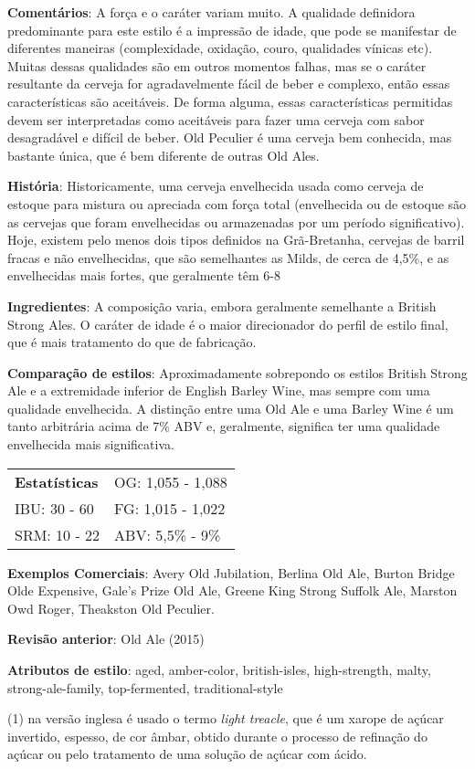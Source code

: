\textbf{Comentários}: A força e o caráter variam muito. A qualidade definidora predominante para este estilo é a impressão de idade, que pode se manifestar de diferentes maneiras (complexidade, oxidação, couro, qualidades vínicas etc). Muitas dessas qualidades são em outros momentos falhas, mas se o caráter resultante da cerveja for agradavelmente fácil de beber e complexo, então essas características são aceitáveis. De forma alguma, essas características permitidas devem ser interpretadas como aceitáveis para fazer uma cerveja com sabor desagradável e difícil de beber. Old Peculier é uma cerveja bem conhecida, mas bastante única, que é bem diferente de outras Old Ales.

\textbf{História}: Historicamente, uma cerveja envelhecida usada como cerveja de estoque para mistura ou apreciada com força total (envelhecida ou de estoque são as cervejas que foram envelhecidas ou armazenadas por um período significativo). Hoje, existem pelo menos dois tipos definidos na Grã-Bretanha, cervejas de barril fracas e não envelhecidas, que são semelhantes as Milds, de cerca de 4,5\%, e as envelhecidas mais fortes, que geralmente têm 6-8%

\textbf{Ingredientes}: A composição varia, embora geralmente semelhante a British Strong Ales. O caráter de idade é o maior direcionador do perfil de estilo final, que é mais tratamento do que de fabricação.

\textbf{Comparação de estilos}: Aproximadamente sobrepondo os estilos British Strong Ale e a extremidade inferior de English Barley Wine, mas sempre com uma qualidade envelhecida. A distinção entre uma Old Ale e uma Barley Wine é um tanto arbitrária acima de 7\% ABV e, geralmente, significa ter uma qualidade envelhecida mais significativa.

\begin{tabular}{@{}p{35mm}p{35mm}@{}}
  \textbf{Estatísticas} & OG: 1,055 - 1,088 \\
  IBU: 30 - 60  & FG: 1,015 - 1,022  \\
  SRM: 10 - 22  & ABV: 5,5\% - 9\%
\end{tabular}

\textbf{Exemplos Comerciais}: Avery Old Jubilation, Berlina Old Ale, Burton Bridge Olde Expensive, Gale’s Prize Old Ale, Greene King Strong Suffolk Ale, Marston Owd Roger, Theakston Old Peculier.

\textbf{Revisão anterior}: Old Ale (2015)

\textbf{Atributos de estilo}: aged, amber-color, british-isles, high-strength, malty, strong-ale-family, top-fermented, traditional-style

(1) na versão inglesa é usado o termo \textit{light treacle}, que é um xarope de açúcar invertido, espesso, de cor âmbar, obtido durante o processo de refinação do açúcar ou pelo tratamento de uma solução de açúcar com ácido.

